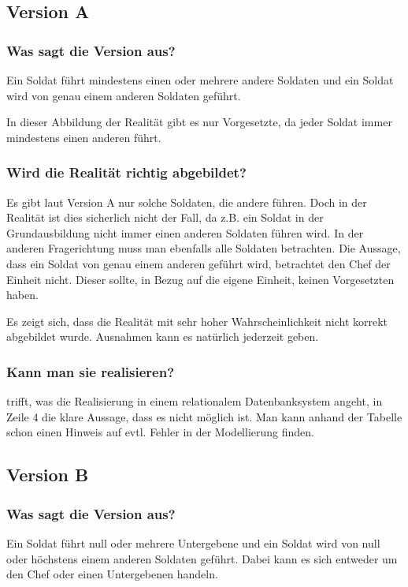         \subsection{Version A}
          \subsubsection{Was sagt die Version aus?}
            Ein Soldat f\"uhrt mindestens einen oder mehrere andere Soldaten und ein Soldat wird von genau einem anderen Soldaten gef\"uhrt.

            In dieser Abbildung der Realit\"at gibt es nur Vorgesetzte, da jeder Soldat immer mindestens einen anderen f\"uhrt.

          \subsubsection{Wird die Realit\"at richtig abgebildet?}
            Es gibt laut Version A nur solche Soldaten, die andere f\"uhren. Doch in der Realit\"at ist dies sicherlich nicht der Fall, da z.B. ein Soldat in der Grundausbildung nicht immer  einen anderen Soldaten f\"uhren wird. In der anderen Fragerichtung muss man ebenfalls alle Soldaten betrachten. Die Aussage, dass ein Soldat von genau einem anderen gef\"uhrt wird, betrachtet den Chef der Einheit nicht. Dieser sollte, in Bezug auf die eigene Einheit, keinen Vorgesetzten haben.

            Es zeigt sich, dass die Realit\"at mit sehr hoher Wahrscheinlichkeit nicht korrekt abgebildet wurde. Ausnahmen kann es nat\"urlich jederzeit geben.
          \subsubsection{Kann man sie realisieren?}
             trifft, was die Realisierung in einem relationalem Datenbanksystem angeht, in Zeile 4 die klare Aussage, dass es nicht m\"oglich ist. Man kann anhand der Tabelle schon einen Hinweis auf evtl. Fehler in der Modellierung finden.
        \subsection{Version B}
          \subsubsection{Was sagt die Version aus?}
            Ein Soldat f\"uhrt null oder mehrere Untergebene und ein Soldat wird von null oder h\"ochstens einem anderen Soldaten gef\"uhrt. Dabei kann es sich entweder um den Chef oder einen Untergebenen handeln.
